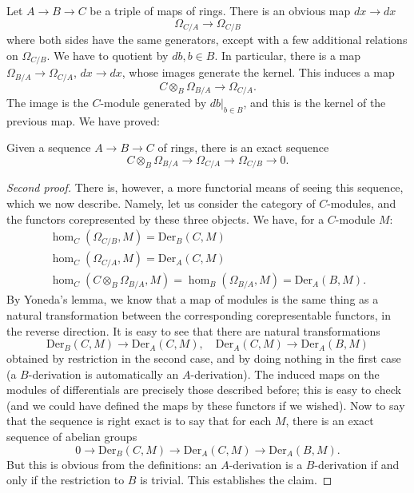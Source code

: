 Let $A \to B \to C$ be a triple of maps of rings. There is an obvious map $dx \to dx$
\[ \Omega_{C/A} \to \Omega_{C/B}  \]
where both sides have the same generators, except with a few additional
relations on $\Omega_{C/B}$. We have to quotient by $db, b \in B$. In
particular, there is a map $\Omega_{B/A} \to \Omega_{C/A}$, $dx \to dx$, whose images
generate the kernel. This induces a map
\[ C \otimes_B \Omega_{B/A} \to \Omega_{C/A}.  \]
The image is the $C$-module generated by $db|_{b \in B}$, and this is the
kernel of the previous map.
We have proved:
\begin{proposition} \label{firstexactseq} Given a sequence $A \to B \to C$ of rings, there is an exact sequence 
\[  C \otimes_B \Omega_{B/A} \to \Omega_{C/A} \to \Omega_{C/B} \to 0 .\]
\end{proposition} 
\begin{proof}[Second proof]
There is, however, a more functorial means of seeing this sequence, which we
now describe. 
Namely, let us consider the category of $C$-modules, and the functors
corepresented by these three objects. We have, for a $C$-module $M$:
\begin{gather*} 
\hom_C(\Omega_{C/B}, M) = \mathrm{Der}_B(C, M) \\
\hom_C(\Omega_{C/A}, M) = \mathrm{Der}_A(C, M) \\
\hom_C(C \otimes_B \Omega_{B/A}, M) = \hom_B(\Omega_{B/A}, M) = \mathrm{Der}_A(B, M).
\end{gather*} 
By Yoneda's lemma, we know that a map of modules is the same thing as a natural
transformation between the corresponding corepresentable functors, in the
reverse direction. 
It is easy to see that there are natural transformations
\[ \mathrm{Der}_B(C, M) \to \mathrm{Der}_A(C, M), \quad \mathrm{Der}_A(C, M) \to \mathrm{Der}_A(B, M)  \]
obtained by restriction in the second case, and by doing nothing in the first
case (a $B$-derivation is automatically an $A$-derivation). 
The induced maps on the modules of differentials are precisely those described
before; this is easy to check (and we could have defined the maps by these
functors if we wished). Now to say that the sequence is right exact is to say
that for each $M$, there is an exact sequence of abelian groups
\[ 0 \to \mathrm{Der}_B(C, M) \to \mathrm{Der}_A(C, M) \to \mathrm{Der}_A(B, M).  \]
But this is obvious from the definitions: an $A$-derivation is a $B$-derivation
if and only if the restriction to $B$ is trivial.
This establishes the claim. 
\end{proof} 



